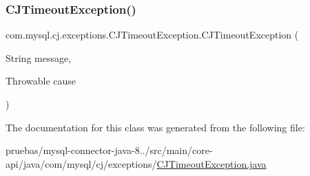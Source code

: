 \mbox{\label{classcom_1_1mysql_1_1cj_1_1exceptions_1_1_c_j_timeout_exception_a5b3db9824c2b446e1fad355a41d11793}} 
\subsubsection{\texorpdfstring{C\+J\+Timeout\+Exception()}{CJTimeoutException()}\hspace{0.1cm}{\footnotesize\ttfamily [4/4]}}
{\footnotesize\ttfamily com.\+mysql.\+cj.\+exceptions.\+C\+J\+Timeout\+Exception.\+C\+J\+Timeout\+Exception (\begin{DoxyParamCaption}\item[{String}]{message,  }\item[{Throwable}]{cause }\end{DoxyParamCaption})}



The documentation for this class was generated from the following file\+:\begin{DoxyCompactItemize}
\item 
pruebas/mysql-\/connector-\/java-\/8../src/main/core-\/api/java/com/mysql/cj/exceptions/\mbox{\hyperlink{_c_j_timeout_exception_8java}{C\+J\+Timeout\+Exception.\+java}}\end{DoxyCompactItemize}

